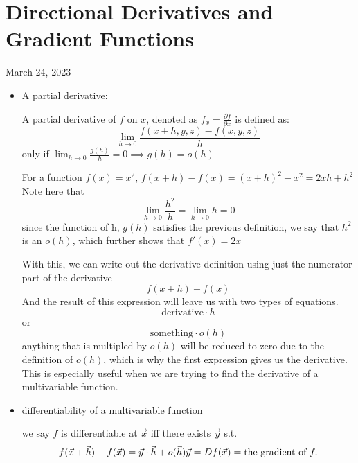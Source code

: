 \section{Directional Derivatives and Gradient Functions}
March 24, 2023
\begin{itemize}
	\item A partial derivative:
		\begin{definition}
			A partial derivative of $f$ on $x$, denoted as $f_x = \frac{\partial f}{\partial x} $ is defined as:
			\begin{equation}
				\lim_{h \to 0} \frac{f\left( x+h, y, z \right) -f\left( x, y, z \right) }{h}
			\end{equation}
			only if $\lim_{h \to 0} \frac{g\left( h \right) }{h} = 0 \implies g\left( h \right)  = o\left( h \right) $
		\end{definition}
		\begin{example}
			For a function $f\left( x \right)  = x^2$, $f\left( x+h \right) -f(x) =  \left( x+h \right) ^2 - x^2 = 2xh + h^2$ 
		Note here that
		\begin{equation}
			\lim_{h \to 0} \frac{h^2}{h} = \lim_{h \to 0} h = 0
		\end{equation}
		since the function of h, $g\left( h \right)$ satisfies the previous definition, we say that $h^2$ is an $o\left( h \right) $, which further shows that $f'\left( x \right)  = 2x$
		\end{example}
		\begin{idea}
			With this, we can write out the derivative definition using just the numerator part of the derivative 
			\begin{equation}
				f\left( x+h \right)  - f\left( x \right) 
			\end{equation}
			And the result of this expression will leave us with two types of equations.
			\begin{equation}
				\text{derivative} \cdot  h
			\end{equation}
			or
			\begin{equation}
				\text{something} \cdot  o\left( h \right) 
			\end{equation}
			anything that is multipled by $o\left( h \right) $ will be reduced to zero due to the definition of $o\left( h \right) $, which is why the first expression gives us the derivative.\\
			This is especially useful when we are trying to find the derivative of a multivariable function. 
		\end{idea} 
	\item differentiability of a multivariable function
\begin{definition}
	we say $f$ is differentiable at $\vec{x}$ iff there exists $\vec{y}$ s.t. \[
	f(\vec{x}+\vec{h}) - f(\vec{x}) = \vec{y} \cdot \vec{h} + o(\vec{h})\\
	\vec{y} = Df(\vec{x}) = \text{the gradient of } f 
	.\] 
\end{definition}


\end{itemize}
